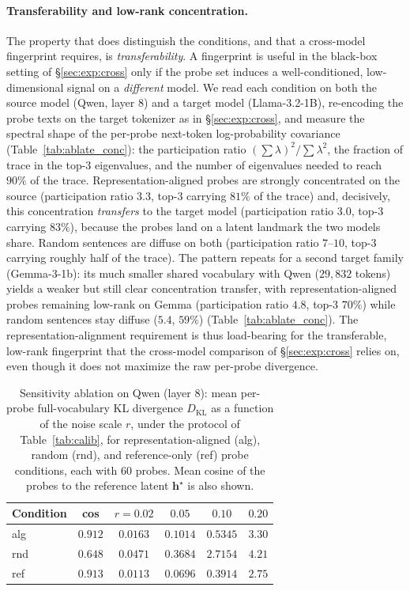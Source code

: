 \documentclass[11pt]{article}
\theoremstyle{definition}
\begin{document}
\paragraph{Transferability and low-rank concentration.}
The property that does distinguish the conditions, and that a cross-model
fingerprint requires, is \emph{transferability}. A fingerprint is useful in the
black-box setting of \S\ref{sec:exp:cross} only if the probe set induces a
well-conditioned, low-dimensional signal on a \emph{different} model. We read
each condition on both the source model (Qwen, layer $8$) and a target model
(Llama-3.2-1B), re-encoding the probe texts on the target tokenizer as in
\S\ref{sec:exp:cross}, and measure the spectral shape of the per-probe
next-token log-probability covariance (Table~\ref{tab:ablate_conc}): the
participation ratio $(\sum \lambda)^2 / \sum \lambda^2$, the fraction of trace in
the top-3 eigenvalues, and the number of eigenvalues needed to reach $90\%$ of
the trace. Representation-aligned probes are strongly concentrated on the
source (participation ratio $3.3$, top-3 carrying $81\%$ of the trace) and,
decisively, this concentration \emph{transfers} to the target model
(participation ratio $3.0$, top-3 carrying $83\%$), because the probes land on a
latent landmark the two models share. Random sentences are diffuse on both
(participation ratio $7$--$10$, top-3 carrying roughly half of the trace). The
pattern repeats for a second target family (Gemma-3-1b): its much smaller
shared vocabulary with Qwen ($29{,}832$ tokens) yields a weaker but still clear
concentration transfer, with representation-aligned probes remaining low-rank
on Gemma (participation ratio $4.8$, top-3 $70\%$) while random sentences stay
diffuse ($5.4$, $59\%$) (Table~\ref{tab:ablate_conc}). The
representation-alignment requirement is thus load-bearing for the transferable,
low-rank fingerprint that the cross-model comparison of \S\ref{sec:exp:cross}
relies on, even though it does not maximize the raw per-probe divergence.

\begin{table}[t]
\centering
\small
\caption{Sensitivity ablation on Qwen (layer 8): mean per-probe full-vocabulary
KL divergence $D_{\mathrm{KL}}$ as a function of the noise scale $r$, under the
protocol of Table~\ref{tab:calib}, for representation-aligned (alg), random
(rnd), and reference-only (ref) probe conditions, each with $60$ probes. Mean
cosine of the probes to the reference latent $\bm{h}^\star$ is also shown.}
\label{tab:ablate_repeq}
\begin{tabular}{lccccc}
\toprule
Condition & cos & $r{=}0.02$ & $0.05$ & $0.10$ & $0.20$ \\
\midrule
alg & $0.912$ & $0.0163$ & $0.1014$ & $0.5345$ & $3.30$ \\
rnd & $0.648$ & $0.0471$ & $0.3684$ & $2.7154$ & $4.21$ \\
ref & $0.913$ & $0.0113$ & $0.0696$ & $0.3914$ & $2.75$ \\
\bottomrule
\end{tabular}
\end{table}
\end{document}

